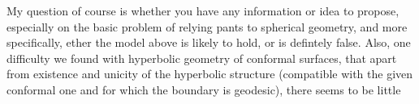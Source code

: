 My question of course is whether you have any information or idea to propose, especially on the basic problem of relying pants to spherical geometry, and more specifically, ether the model above is likely to hold, or is defintely false. Also, one difficulty we found with hyperbolic geometry of conformal surfaces,  that apart from existence and unicity of the hyperbolic structure (compatible with the given conformal one and for which the boundary is geodesic), there seems to be little
